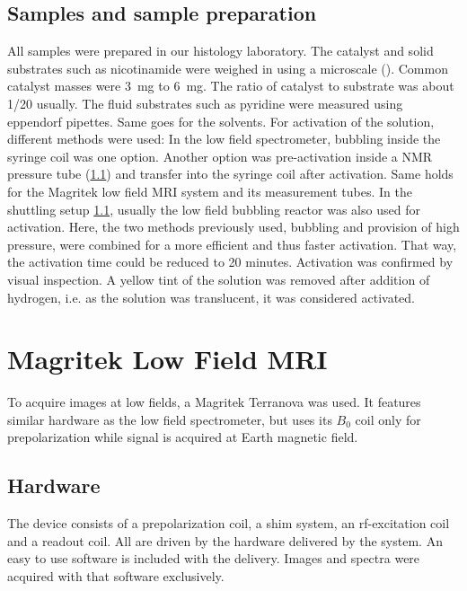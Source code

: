        \subsection{Samples and sample preparation}
        All samples were prepared in our histology laboratory. The catalyst and solid substrates such as nicotinamide were weighed in using a microscale (). Common catalyst masses were \SI{3}{\milli\gram} to \SI{6}{\milli\gram}. The ratio of catalyst to substrate was about \SI{1/20}{} usually. The fluid substrates such as pyridine were measured using eppendorf pipettes. Same goes for the solvents.
        For activation of the solution, different methods were used: In the low field spectrometer, bubbling inside the syringe coil was one option. Another option was pre-activation inside a NMR pressure tube (\ref{}) and transfer into the syringe coil after activation. Same holds for the Magritek low field MRI system and its measurement tubes.
        In the shuttling setup \ref{}, usually the low field bubbling reactor was also used for activation. Here, the two methods previously used, bubbling and provision of high pressure, were combined for a more efficient and thus faster activation. That way, the activation time could be reduced to 20 minutes.
        Activation was confirmed by visual inspection. A yellow tint of the solution was removed after addition of hydrogen, i.e. as the solution was translucent, it was considered activated.
    \section{Magritek Low Field MRI}
            To acquire images at low fields, a Magritek Terranova  was used. It features similar hardware as the low field spectrometer, but uses its $B_0$ coil only for prepolarization while signal is acquired at Earth magnetic field.
        \subsection{Hardware}
            The device consists of a prepolarization coil, a shim system, an rf-excitation coil and a readout coil. All are driven by the hardware delivered by the system. An easy to use software is included with the delivery. Images and spectra were acquired with that software exclusively.
